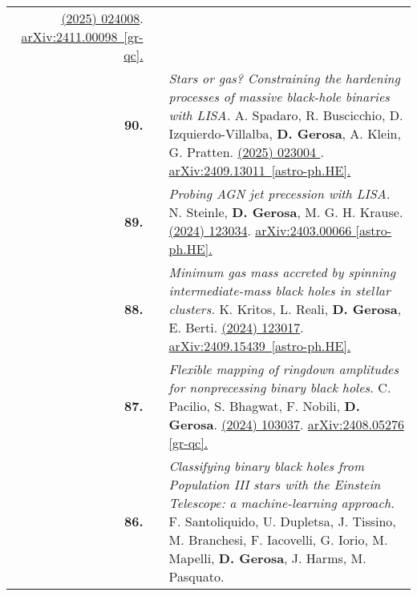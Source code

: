 {\begin{longtable}{rp{0.3cm}p{15.8cm}}
\href{https://journals.aps.org/prd/abstract/10.1103/PhysRevD.111.024008}{\prd 111 (2025) 024008}. \href{https://arxiv.org/abs/2411.00098}{arXiv:2411.00098 [gr-qc].}
\vspace{0.09cm}\\
%
\textbf{90.} & & \textit{Stars or gas? Constraining the hardening processes of massive black-hole binaries with LISA.}
\newline{}
A. Spadaro, R. Buscicchio, D. Izquierdo-Villalba, \textbf{D. Gerosa}, A. Klein, G. Pratten.
\newline{}
\href{https://journals.aps.org/prd/abstract/10.1103/PhysRevD.111.023004}{\prd 111 (2025) 023004 }. \href{https://arxiv.org/abs/2409.13011}{arXiv:2409.13011 [astro-ph.HE].}
\vspace{0.09cm}\\
%
\textbf{89.} & & \textit{Probing AGN jet precession with LISA.}
\newline{}
N. Steinle, \textbf{D. Gerosa}, M. G. H. Krause.
\newline{}
\href{https://journals.aps.org/prd/abstract/10.1103/PhysRevD.110.123034}{\prd 110 (2024) 123034}. \href{https://arxiv.org/abs/2403.00066}{arXiv:2403.00066 [astro-ph.HE].}
\vspace{0.09cm}\\
%
\textbf{88.} & & \textit{Minimum gas mass accreted by spinning intermediate-mass black holes in stellar clusters.}
\newline{}
K. Kritos, L. Reali, \textbf{D. Gerosa}, E. Berti.
\newline{}
\href{https://journals.aps.org/prd/abstract/10.1103/PhysRevD.110.123017}{\prd 110 (2024) 123017}. \href{https://arxiv.org/abs/2409.15439}{arXiv:2409.15439 [astro-ph.HE].}
\vspace{0.09cm}\\
%
\textbf{87.} & & \textit{Flexible mapping of ringdown amplitudes for nonprecessing binary black holes.}
\newline{}
C. Pacilio, S. Bhagwat, F. Nobili, \textbf{D. Gerosa}.
\newline{}
\href{https://journals.aps.org/prd/abstract/10.1103/PhysRevD.110.103037}{\prd 110 (2024) 103037}. \href{https://arxiv.org/abs/2408.05276}{arXiv:2408.05276 [gr-qc].}
\vspace{0.09cm}\\
%
\textbf{86.} & & \textit{Classifying binary black holes from Population III stars with the Einstein Telescope: a machine-learning approach.}
\newline{}
F. Santoliquido, U. Dupletsa, J. Tissino, M. Branchesi, F. Iacovelli, G. Iorio, M. Mapelli, \textbf{D. Gerosa}, J. Harms, M. Pasquato.

\end{longtable}}
